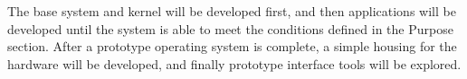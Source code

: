 \documentclass[letterpaper,twocolumn,10pt]{article}
\begin{document}
The base system and kernel will be developed first, and then applications will be developed until the system is able to meet the conditions defined in the Purpose section. After a prototype operating system is complete, a simple housing for the hardware will be developed, and finally prototype interface tools will be explored.

{\footnotesize 
}
\end{document}
